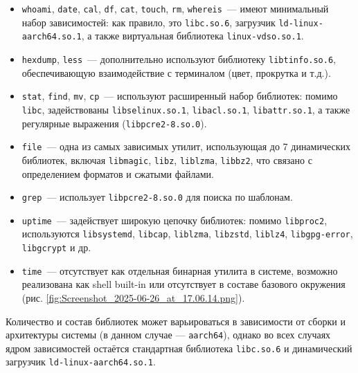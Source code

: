 \begin{itemize}
    \item \texttt{whoami}, \texttt{date}, \texttt{cal}, \texttt{df}, \texttt{cat}, \texttt{touch}, \texttt{rm}, \texttt{whereis}~--- имеют минимальный набор зависимостей: как правило, это \texttt{libc.so.6}, загрузчик \break\texttt{ld-linux-aarch64.so.1}, а также виртуальная библиотека \break\texttt{linux-vdso.so.1}.

    \item \texttt{hexdump}, \texttt{less}~--- дополнительно используют библиотеку \texttt{libtinfo.so.6}, обеспечивающую взаимодействие с терминалом (цвет, прокрутка и т.д.).

    \item \texttt{stat}, \texttt{find}, \texttt{mv}, \texttt{cp}~--- используют расширенный набор библиотек: помимо \texttt{libc}, задействованы \texttt{libselinux.so.1}, \texttt{libacl.so.1}, \texttt{libattr.so.1}, а также регулярные выражения (\texttt{libpcre2-8.so.0}).

    \item \texttt{file}~— одна из самых зависимых утилит, использующая до 7 динамических библиотек, включая \texttt{libmagic}, \texttt{libz}, \texttt{liblzma}, \texttt{libbz2}, что связано с определением форматов и сжатыми файлами.

    \item \texttt{grep}~— использует \texttt{libpcre2-8.so.0} для поиска по шаблонам.

    \item \texttt{uptime}~— задействует широкую цепочку библиотек: помимо \texttt{libproc2}, используются \texttt{libsystemd}, \texttt{libcap}, \texttt{liblzma}, \texttt{libzstd}, \texttt{liblz4}, \texttt{libgpg-error}, \texttt{libgcrypt} и др.

    \item \texttt{time}~— отсутствует как отдельная бинарная утилита в системе, возможно реализована как shell built-in или отсутствует в составе базового окружения (рис. \ref{fig:Screenshot_2025-06-26_at_17.06.14.png}).
\end{itemize}


Количество и состав библиотек может варьироваться в зависимости от сборки и архитектуры системы (в данном случае — \texttt{aarch64}), однако во всех случаях ядром зависимостей остаётся стандартная библиотека \texttt{libc.so.6} и динамический загрузчик \texttt{ld-linux-aarch64.so.1}.

